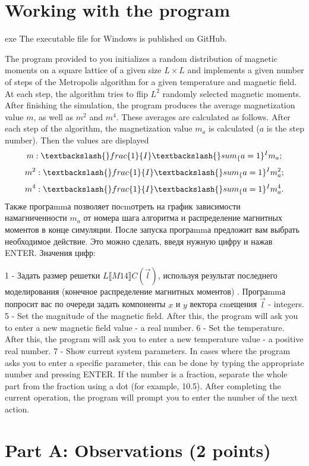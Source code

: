 \documentclass[11pt,a4paper]{article}
\begin{document}
\section*{Working with the program}

exe The executable file for Windows is published on GitHub.

The program provided to you initializes a random distribution of magnetic moments on a square lattice of a given size $L \times L$ and implements a given number of steps of the Metropolis algorithm for a given temperature and magnetic field. At each step, the algorithm tries to flip $L^2$ randomly selected magnetic moments. After finishing the simulation, the program produces the average magnetization value $m$, as well as $m^2$ and $m^4$. These averages are calculated as follows. After each step of the algorithm, the magnetization value $m_a$ is calculated ($a$ is the step number). Then the values are displayed $$ m : \textbackslash\{\}frac\{1\}\{I\}\textbackslash\{\}sum_\{a=1\}^I m_a; $$ $$ m ^2:  \textbackslash\{\}frac\{1\}\{I\}\textbackslash\{\}sum_\{a=1\}^I m_a^2; $$ $$ m^4: \textbackslash\{\}frac\{1\}\{I\}\textbackslash\{\}sum_\{a=1\}^I m_a^4. $$ Также програmmа позволяет поcmотреть на график зависимости намагниченности $m_a$ от номера шага алгоритма и распределение магнитных моментов в конце симуляции. После запуска програmmа предложит вам выбрать необходимое действие. Это можно сделать, введя нужную цифру и нажав ENTER. Значения цифр:

1 - Задать размер решетки $L⟦ M14⟧C(\vec{l})$, используя результат последнего моделирования (конечное распределение магнитных моментов) . Програmmа попросит вас по очереди задать компоненты $x$ и $y$ вектора cmещения $\vec{l}$ - integers. 5 - Set the magnitude of the magnetic field. After this, the program will ask you to enter a new magnetic field value - a real number. 6 - Set the temperature. After this, the program will ask you to enter a new temperature value - a positive real number. 7 - Show current system parameters. In cases where the program asks you to enter a specific parameter, this can be done by typing the appropriate number and pressing ENTER. If the number is a fraction, separate the whole part from the fraction using a dot (for example, 10.5). After completing the current operation, the program will prompt you to enter the number of the next action.

\section*{Part A: Observations (2 points)}
\end{document}
